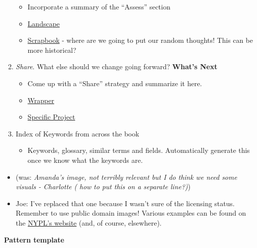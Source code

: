 \begin{enumerate}
  \begin{itemize}
  \tightlist
  \item
    Incorporate a summary of the ``Assess'' section
  \item
    \href{https://hackmd.io/tnyTuPcaR_GtHZNnYcZyxA}{Landscape}
  \item
    \href{https://hackmd.io/Hz9Q3NU8Rgittp9b6oezHw}{Scrapbook} - where
    are we going to put our random thoughts! This can be more
    historical?
  \end{itemize}
\item
  \emph{Share}. What else should we change going forward? \textbf{What's
  Next}

  \begin{itemize}
  \tightlist
  \item
    Come up with a ``Share'' strategy and summarize it here.
  \item
    \href{https://hackmd.io/q5K5GstZTsqXTHrCRyYQJA}{Wrapper}
  \item
    \href{https://hackmd.io/xV24x23vQ2G1ScRHXBdMFA}{Specific Project}
  \end{itemize}
\item
  Index of Keywords from across the book

  \begin{itemize}
  \tightlist
  \item
    Keywords, glossary, similar terms and fields. Automatically generate
    this once we know what the keywords are.
  \end{itemize}
\end{enumerate}

\begin{itemize}
\tightlist
\item
  (was: \emph{Amanda's image, not terribly relevant but I do think we
  need some visuals - Charlotte ( how to put this on a separate line?)})
\item
  Joe: I've replaced that one because I wasn't sure of the licensing
  status. Remember to use public domain images! Various examples can be
  found on the
  \href{https://digitalcollections.nypl.org/search/index?filters\%5Brights\%5D=pd\&keywords=}{NYPL's
  website} (and, of course, elsewhere).
\end{itemize}

\textbf{Pattern template}

